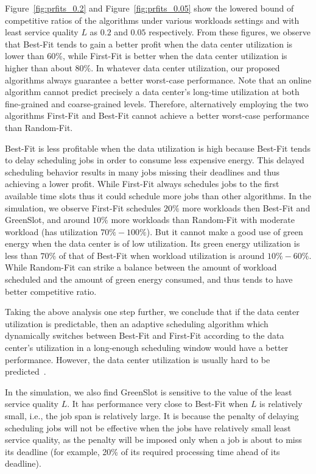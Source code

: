 \documentclass[conference]{IEEEtran}
\begin{document}
Figure~\ref{fig:prfits_0.2} and Figure~\ref{fig:prfits_0.05} show the lowered bound of competitive ratios of the algorithms under various workloads settings and with least service quality $L$ as $0.2$ and $0.05$ respectively. From these figures, we observe that Best-Fit tends to gain a better profit when the data center utilization is lower than $60\%$, while First-Fit is better when the data center utilization is higher than about $80\%$. In whatever data center utilization, our proposed algorithms always guarantee a better worst-case performance. Note that an online algorithm cannot predict precisely a data center's long-time utilization at both fine-grained and coarse-grained levels. Therefore, alternatively employing the two algorithms First-Fit and Best-Fit cannot achieve a better worst-case performance than Random-Fit.

Best-Fit is less profitable when the data utilization is high because Best-Fit tends to delay scheduling jobs in order to consume less expensive energy. This delayed scheduling behavior results in many jobs missing their deadlines and thus achieving a lower profit. While First-Fit always schedules jobs to the first available time slots thus it could schedule more jobs than other algorithms. In the simulation, we observe First-Fit schedules $20\%$ more workloads then Best-Fit and GreenSlot, and around $10\%$ more workloads than Random-Fit with moderate workload (has utilization $70\%-100\%$). But it cannot make a good use of green energy when the data center is of low utilization. Its green energy utilization is less than $70\%$ of that of Best-Fit when workload utilization is around $10\%-60\%$. While Random-Fit can strike a balance between the amount of workload scheduled and the amount of green energy consumed, and thus tends to have better competitive ratio.

Taking the above analysis one step further, we conclude that if the data center utilization is predictable, then an adaptive scheduling algorithm which dynamically switches between Best-Fit and First-Fit according to the data center's utilization in a long-enough scheduling window would have a better performance. However, the data center utilization is usually hard to be predicted~\cite{MeisnerW10}.

In the simulation, we also find GreenSlot is sensitive to the value of the least service quality $L$. It has performance very close to Best-Fit when $L$ is relatively small, i.e., the job span is relatively large. It is because the penalty of delaying scheduling jobs will not be effective when the jobs have relatively small least service quality, as the penalty will be imposed only when a job is about to miss its deadline (for example, 20\% of its required processing time ahead of its deadline).
\end{document}
